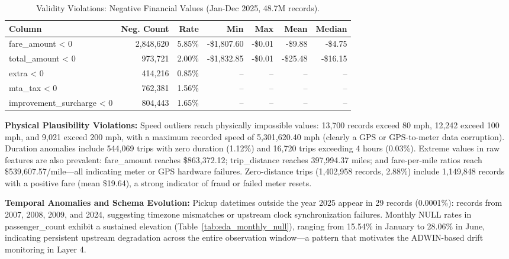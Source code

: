 \begin{table}[H]
\centering
\caption{Validity Violations: Negative Financial Values (Jan-Dec 2025, 48.7M records).}
\label{tab:eda_neg}
\begin{tabular}{lrrrrrr}
\toprule
\textbf{Column} & \textbf{Neg. Count} & \textbf{Rate} & \textbf{Min} & \textbf{Max} & \textbf{Mean} & \textbf{Median} \\
\midrule
fare\_amount < 0              &  2,848,620 & 5.85\% & -\$1,807.60 & -\$0.01 &  -\$9.88 & -\$4.75 \\
total\_amount < 0             &    973,721 & 2.00\% & -\$1,832.85 & -\$0.01 & -\$25.48 & -\$16.15 \\
extra < 0                     &    414,216 & 0.85\% & --           & --       & --         & --          \\
mta\_tax < 0                  &    762,381 & 1.56\% & --           & --       & --         & --          \\
improvement\_surcharge < 0    &    804,443 & 1.65\% & --           & --       & --         & --          \\
\bottomrule
\end{tabular}
\end{table}

\textbf{Physical Plausibility Violations:} Speed outliers reach physically impossible values: 13,700 records exceed 80 mph, 12,242 exceed 100 mph, and 9,021 exceed 200 mph, with a maximum recorded speed of 5,301,620.40 mph (clearly a GPS or GPS-to-meter data corruption). Duration anomalies include 544,069 trips with zero duration (1.12\%) and 16,720 trips exceeding 4 hours (0.03\%). Extreme values in raw features are also prevalent: fare\_amount reaches \$863,372.12; trip\_distance reaches 397,994.37 miles; and fare-per-mile ratios reach \$539,607.57/mile---all indicating meter or GPS hardware failures. Zero-distance trips (1,402,958 records, 2.88\%) include 1,149,848 records with a positive fare (mean \$19.64), a strong indicator of fraud or failed meter resets.

\textbf{Temporal Anomalies and Schema Evolution:} Pickup datetimes outside the year 2025 appear in 29 records (0.0001\%): records from 2007, 2008, 2009, and 2024, suggesting timezone mismatches or upstream clock synchronization failures. Monthly NULL rates in passenger\_count exhibit a sustained elevation (Table~\ref{tab:eda_monthly_null}), ranging from 15.54\% in January to 28.06\% in June, indicating persistent upstream degradation across the entire observation window---a pattern that motivates the ADWIN-based drift monitoring in Layer 4.

